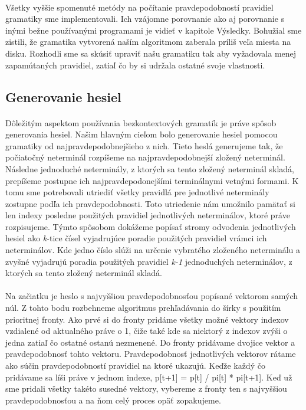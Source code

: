 \paragraph{}
Všetky vyššie spomenuté metódy na počítanie pravdepodobností pravidiel gramatiky sme implementovali. Ich vzájomne porovnanie ako aj porovnanie s inými bežne používanými programami je vidieť v kapitole Výsledky. Bohužial sme zistili, že gramatika vytvorená naším algoritmom zaberala príliš veľa miesta na disku. Rozhodli sme sa skúsiť upraviť našu gramatiku tak aby vyžadovala menej zapamútaných pravidiel, zatiaľ čo by si udržala ostatné svoje vlastnosti.

\subsection{Generovanie hesiel}
\paragraph{}
Dôležitým aspektom používania bezkontextových gramatík je práve spôsob generovania hesiel. Našim hlavným cieľom bolo generovanie hesiel pomocou gramatiky od najpravdepodobnejšieho z nich. Tieto heslá generujeme tak, že počiatočný neterminál rozpíšeme na najpravdepodobnejší zložený neterminál. Následne jednoduché neterminály, z ktorých sa tento zložený neterminál skladá, prepíšeme postupne ich najpravdepodonejšími terminálnymi vetnými formami. K tomu sme potrebovali utriediť všetky pravidlá pre jednotlivé neterminály zostupne podľa ich pravdepodobnosti. Toto utriedenie nám umožnilo pamätať si len indexy posledne použitých pravidiel jednotlivých neterminálov, ktoré práve rozpisujeme. Týmto spôsobom dokážeme popísať stromy odvodenia jednotlivých hesiel ako \emph{k}-tice čísel vyjadrujúce poradie použitých pravidiel vrámci ich neterminálov. Kde jedno číslo slúži na určenie vybratého zloženého neterminálu a zvyšné vyjadrujú poradia použitých pravidiel \emph{k-1} jednoduchých neterminálov, z ktorých sa tento zložený neterminál skladá.
\paragraph{}
Na začiatku je heslo s najvyššiou pravdepodobnosťou popísané vektorom samých núl. Z tohto bodu rozbehneme algoritmus prehľadávania do šírky s použitím prioritnej fronty. Ako prvé si do fronty pridáme všetky možné vektory indexov vzdialené od aktualného práve o 1, čiže také kde sa niektorý z indexov zvýši o jedna zatiaľ čo ostatné ostanú nezmenené. Do fronty pridávame dvojice vektor a pravdepodobnosť tohto vektoru. Pravdepodobnosť jednotlivých vektorov rátame ako súčin pravdepodobností pravidiel na ktoré ukazujú. Keďže každý čo pridávame sa líši práve v jednom indexe, p[t+1] = p[t] / pi[t] * pi[t+1]. Keď už sme pridali všetky takéto susedné vektory, vybereme z fronty ten s najvyššiou pravdepodobnosťou a na ňom celý proces opäť zopakujeme.
